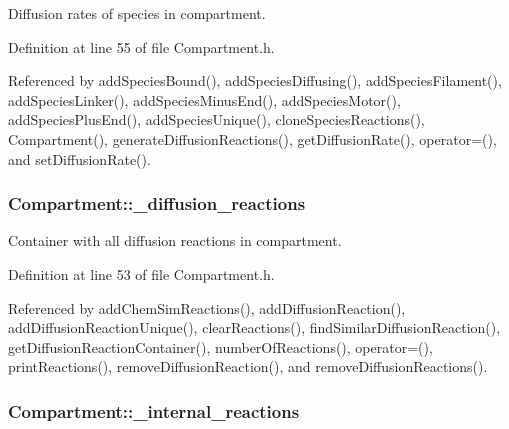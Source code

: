 Diffusion rates of species in compartment. 



Definition at line 55 of file Compartment.\+h.



Referenced by add\+Species\+Bound(), add\+Species\+Diffusing(), add\+Species\+Filament(), add\+Species\+Linker(), add\+Species\+Minus\+End(), add\+Species\+Motor(), add\+Species\+Plus\+End(), add\+Species\+Unique(), clone\+Species\+Reactions(), Compartment(), generate\+Diffusion\+Reactions(), get\+Diffusion\+Rate(), operator=(), and set\+Diffusion\+Rate().

\hypertarget{classCompartment_a65651faf3e83b092235afdba261cf820}{
\subsubsection[{\+\_\+diffusion\+\_\+reactions}]{ Compartment\+::\+\_\+diffusion\+\_\+reactions\hspace{0.3cm}{\ttfamily [protected]}}}\label{classCompartment_a65651faf3e83b092235afdba261cf820}


Container with all diffusion reactions in compartment. 



Definition at line 53 of file Compartment.\+h.



Referenced by add\+Chem\+Sim\+Reactions(), add\+Diffusion\+Reaction(), add\+Diffusion\+Reaction\+Unique(), clear\+Reactions(), find\+Similar\+Diffusion\+Reaction(), get\+Diffusion\+Reaction\+Container(), number\+Of\+Reactions(), operator=(), print\+Reactions(), remove\+Diffusion\+Reaction(), and remove\+Diffusion\+Reactions().

\hypertarget{classCompartment_a76ec81e3474bacae837cce0081a03039}{
\subsubsection[{\+\_\+internal\+\_\+reactions}]{ Compartment\+::\+\_\+internal\+\_\+reactions\hspace{0.3cm}{\ttfamily [protected]}}}\label{classCompartment_a76ec81e3474bacae837cce0081a03039}


